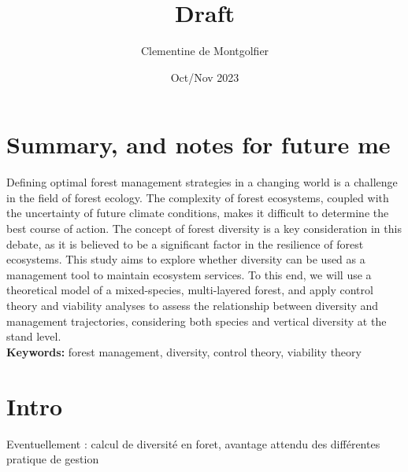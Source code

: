 \documentclass{article}
\title{Draft}
\author{Clementine de Montgolfier}
\date{Oct/Nov 2023}
\begin{document}
\maketitle

\section{Summary, and notes for future me}

Defining optimal forest management strategies in a changing world is a challenge in the field of forest ecology. The complexity of forest ecosystems, coupled with the uncertainty of future climate conditions, makes it difficult to determine the best course of action. The concept of forest diversity is a key consideration in this debate, as it is believed to be a significant factor in the resilience of forest ecosystems. This study aims to explore whether diversity can be used as a management tool to maintain ecosystem services. To this end, we will use a theoretical model of a mixed-species, multi-layered forest, and apply control theory and viability analyses to assess the relationship between diversity and management trajectories, considering both species and vertical diversity at the stand level.\\

\noindent \textbf{Keywords:} forest management, diversity, control theory, viability theory

\section{Intro}
Eventuellement : calcul de diversité en foret, avantage attendu des différentes pratique de gestion
\end{document}
